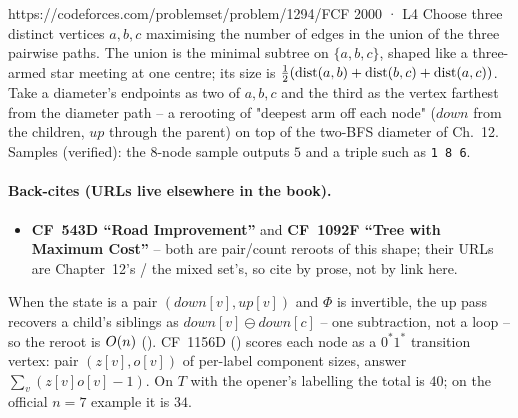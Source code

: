 \begin{practiceset}
    {https://codeforces.com/problemset/problem/1294/F}{CF 2000 · L4}
    {Choose three distinct vertices $a,b,c$ maximising the number of edges in
    the union of the three pairwise paths. The union is the minimal subtree on
    $\{a,b,c\}$, shaped like a three-armed star meeting at one centre; its size
    is $\tfrac12(\operatorname{dist}(a,b)+\operatorname{dist}(b,c)+\operatorname{dist}(a,c))$. Take a diameter's endpoints
    as two of $a,b,c$ and the third as the vertex farthest from the diameter
    path -- a rerooting of "deepest arm off each node" ($\mathit{down}$ from the
    children, $\mathit{up}$ through the parent) on top of the two-BFS diameter
    of Ch.~12. Samples (verified): the $8$-node sample outputs $5$ and a triple
    such as \texttt{1 8 6}.
    }
\end{practiceset}

\paragraph{Back-cites (URLs live elsewhere in the book).}
\begin{itemize}[nosep,leftmargin=1.4em]
  \item \textbf{CF~543D ``Road Improvement''} and \textbf{CF~1092F ``Tree with
        Maximum Cost''} -- both are pair/count reroots of this shape; their URLs
        are Chapter~12's / the mixed set's, so cite by prose, not by link here.
\end{itemize}

\begin{recallbox}
When the state is a pair $(\mathit{down}[v],\mathit{up}[v])$ and $\Phi$ is
invertible, the up pass recovers a child's siblings as
$\mathit{down}[v]\ominus\mathit{down}[c]$ -- one subtraction, not a loop -- so
the reroot is $O(n)$ (). CF~1156D
() scores each node as a $0^{\ast}1^{\ast}$
transition vertex: pair $(z[v],o[v])$ of per-label component sizes, answer
$\sum_v(z[v]o[v]-1)$. On $T$ with the opener's labelling the total is $40$; on
the official $n=7$ example it is $34$.
\end{recallbox}
